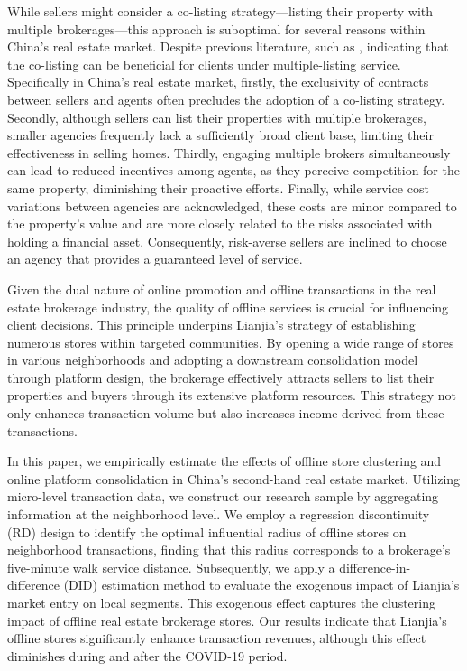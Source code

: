 \documentclass[11pt]{article}
\begin{document}
While sellers might consider a co-listing strategy—listing their property with multiple brokerages—this approach is suboptimal for several reasons within China's real estate market. Despite previous literature, such as \citep{RePEc:kap:jrefec:v:67:y:2023:i:3:d:10.1007_s11146-021-09858-w}, indicating that the co-listing can be beneficial for clients under multiple-listing service. Specifically in China's real estate market, firstly, the exclusivity of contracts between sellers and agents often precludes the adoption of a co-listing strategy. Secondly, although sellers can list their properties with multiple brokerages, smaller agencies frequently lack a sufficiently broad client base, limiting their effectiveness in selling homes. Thirdly, engaging multiple brokers simultaneously can lead to reduced incentives among agents, as they perceive competition for the same property, diminishing their proactive efforts. Finally, while service cost variations between agencies are acknowledged, these costs are minor compared to the property's value and are more closely related to the risks associated with holding a financial asset. Consequently, risk-averse sellers are inclined to choose an agency that provides a guaranteed level of service. 

Given the dual nature of online promotion and offline transactions in the real estate brokerage industry, the quality of offline services is crucial for influencing client decisions. This principle underpins Lianjia's strategy of establishing numerous stores within targeted communities. By opening a wide range of stores in various neighborhoods and adopting a downstream consolidation model through platform design, the brokerage effectively attracts sellers to list their properties and buyers through its extensive platform resources. This strategy not only enhances transaction volume but also increases income derived from these transactions.

In this paper, we empirically estimate the effects of offline store clustering and online platform consolidation in China's second-hand real estate market. Utilizing micro-level transaction data, we construct our research sample by aggregating information at the neighborhood level. We employ a regression discontinuity (RD) design to identify the optimal influential radius of offline stores on neighborhood transactions, finding that this radius corresponds to a brokerage's five-minute walk service distance. Subsequently, we apply a difference-in-difference (DID) estimation method to evaluate the exogenous impact of Lianjia's market entry on local segments. This exogenous effect captures the clustering impact of offline real estate brokerage stores. Our results indicate that Lianjia's offline stores significantly enhance transaction revenues, although this effect diminishes during and after the COVID-19 period.
\end{document}

